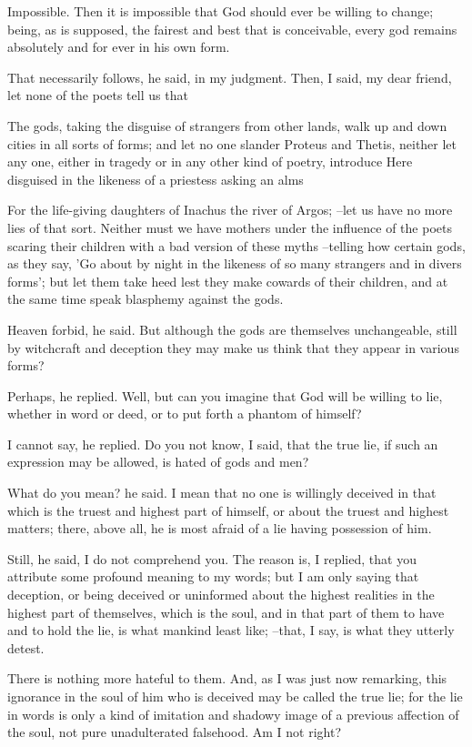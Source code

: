 Impossible.
Then it is impossible that God should ever be willing to change; being, as is supposed, the fairest and best that is conceivable, every god remains absolutely and for ever in his own form.

That necessarily follows, he said, in my judgment.
Then, I said, my dear friend, let none of the poets tell us that

The gods, taking the disguise of strangers from other lands, walk up and down cities in all sorts of forms; and let no one slander Proteus and Thetis, neither let any one, either in tragedy or in any other kind of poetry, introduce Here disguised in the likeness of a priestess asking an alms

For the life-giving daughters of Inachus the river of Argos; --let us have no more lies of that sort. Neither must we have mothers under the influence of the poets scaring their children with a bad version of these myths --telling how certain gods, as they say, 'Go about by night in the likeness of so many strangers and in divers forms'; but let them take heed lest they make cowards of their children, and at the same time speak blasphemy against the gods.

Heaven forbid, he said.
But although the gods are themselves unchangeable, still by witchcraft and deception they may make us think that they appear in various forms?

Perhaps, he replied.
Well, but can you imagine that God will be willing to lie, whether in word or deed, or to put forth a phantom of himself?

I cannot say, he replied.
Do you not know, I said, that the true lie, if such an expression may be allowed, is hated of gods and men?

What do you mean? he said.
I mean that no one is willingly deceived in that which is the truest and highest part of himself, or about the truest and highest matters; there, above all, he is most afraid of a lie having possession of him.

Still, he said, I do not comprehend you.
The reason is, I replied, that you attribute some profound meaning to my words; but I am only saying that deception, or being deceived or uninformed about the highest realities in the highest part of themselves, which is the soul, and in that part of them to have and to hold the lie, is what mankind least like; --that, I say, is what they utterly detest.

There is nothing more hateful to them.
And, as I was just now remarking, this ignorance in the soul of him who is deceived may be called the true lie; for the lie in words is only a kind of imitation and shadowy image of a previous affection of the soul, not pure unadulterated falsehood. Am I not right?

